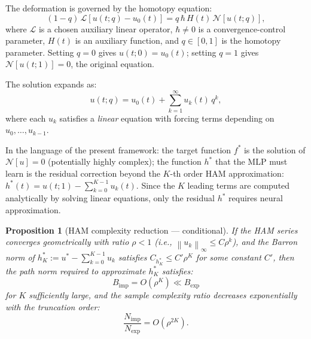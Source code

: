 \documentclass[12pt]{article}
\newtheorem{proposition}[theorem]{Proposition}
\newcommand{\norm}[1]{\left\|#1\right\|}
\begin{document}
The deformation is governed by the homotopy equation:
\begin{equation}
  (1-q)\,\mathcal{L}[u(t;q) - u_0(t)]
  = q\,\hbar\,H(t)\,\mathcal{N}[u(t;q)],
  \label{eq:HAM}
\end{equation}
where $\mathcal{L}$ is a chosen auxiliary linear operator,
$\hbar \ne 0$ is a convergence-control parameter,
$H(t)$ is an auxiliary function, and $q \in [0,1]$ is the homotopy
parameter.
Setting $q = 0$ gives $u(t;0) = u_0(t)$; setting $q = 1$ gives
$\mathcal{N}[u(t;1)] = 0$, the original equation.

The solution expands as:
\begin{equation}
  u(t;q) = u_0(t) + \sum_{k=1}^{\infty} u_k(t)\,q^k,
\end{equation}
where each $u_k$ satisfies a \emph{linear} equation with forcing
terms depending on $u_0, \ldots, u_{k-1}$.

In the language of the present framework:
the target function $f^*$ is the solution of $\mathcal{N}[u] = 0$
(potentially highly complex);
the function $h^*$ that the MLP must learn is the residual
correction beyond the $K$-th order HAM approximation:
$h^*(t) = u(t;1) - \sum_{k=0}^{K-1} u_k(t)$.
Since the $K$ leading terms are computed analytically by solving
linear equations, only the residual $h^*$ requires neural
approximation.

\begin{proposition}[HAM complexity reduction --- conditional]
\label{prop:HAM}
If the HAM series converges geometrically with ratio $\rho < 1$
(i.e., $\norm{u_k}_\infty \le C\rho^k$), and the Barron norm of
$h^*_K := u^* - \sum_{k=0}^{K-1} u_k$ satisfies
$C_{h^*_K} \le C' \rho^K$ for some constant $C'$, then the path norm
required to approximate $h^*_K$ satisfies:
\begin{equation}
  B_{\mathrm{imp}} = O(\rho^K) \ll B_{\mathrm{exp}}
\end{equation}
for $K$ sufficiently large, and the sample complexity ratio
decreases exponentially with the truncation order:
\begin{equation}
  \frac{N_{\mathrm{imp}}}{N_{\mathrm{exp}}}
  = O(\rho^{2K}).
\end{equation}
\end{proposition}
\end{document}
